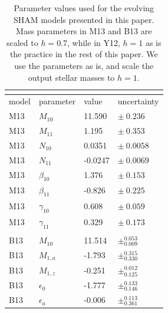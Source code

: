 \documentclass[useAMS,fleqn,usenatbib]{mnras}
\begin{document}
\begin{table}
\label{table:model_parameters}
\caption{Parameter values used for the evolving SHAM models presented in this paper. Mass parameters in M13 and B13 are scaled to $h=0.7$, while in Y12, $h=1$ as is the practice in the rest of this paper.  We use the parameters as is, and scale the output stellar masses to $h=1$.}
\begin{tabular}{ |p{1.5cm}|p{1.6cm}|p{1.2cm}|p{2cm}}
\multicolumn{4}{|c|}{} \\
\hline
model & parameter & value & uncertainty \\
\hline
\hline
M13		& $M_{10}$ 		&  11.590 		& $\pm~0.236$ 			\\%
M13 		& $M_{11}$ 		&  1.195  		& $\pm~0.353$			\\%
M13 		& $N_{10}$ 		&  0.0351 		& $\pm~0.0058$			\\%
M13 		& $N_{11}$ 		&  -0.0247		& $\pm~0.0069$			\\%
M13 		& $\beta_{10}$ 		&  1.376 		& $\pm~0.153$			\\%
M13 		& $\beta_{11}$ 		& -0.826  		& $\pm~0.225$ 			\\%
M13 		& $\gamma_{10}$ 	&  0.608 		& $\pm~0.059$			\\%
M13 		& $\gamma_{11}$ 	&  0.329 		& $\pm~0.173$ 			\\%
\\
B13		& $M_{10}$ 		&  11.514 		& $\pm^{0.053}_{0.009}$ 	\\%
B13		& $M_{1,a}$ 		&  -1.793 		& $\pm^{0.315}_{0.330}$ 	\\%
B13		& $M_{1,z}$ 		&  -0.251		& $\pm^{0.012}_{0.125}$ 	\\%
B13		& $\epsilon_{0}$ 	&  -1.777		& $\pm^{0.133}_{0.146}$ 	\\%
B13		& $\epsilon_{a}$ 	&  -0.006		& $\pm^{0.113 }_{0.361}$ 	\\%

\end{tabular}
\end{table}
\end{document}
